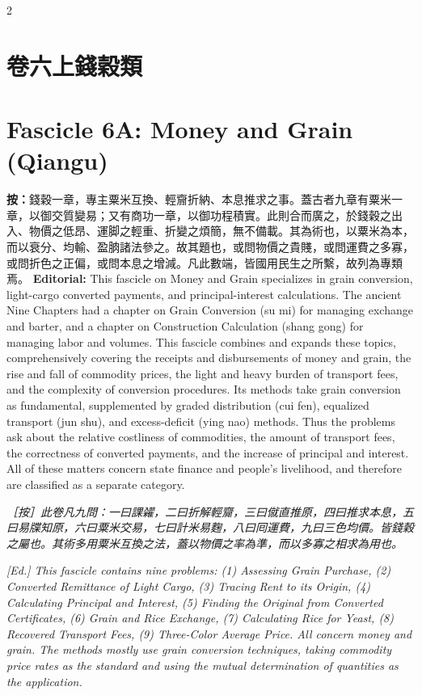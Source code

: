 \documentclass[11pt,a4paper]{article}
\newcommand{\EdNoteText}[1]{\par\noindent\textit{\color{ednotecolor}［按］#1}\par}
\newcommand{\EdNoteEn}[1]{\par\noindent\textit{\color{ednotecolor}[Ed.] #1}\par}
\begin{document}
\newpage
\begin{paracol}{2}

\section*{\color{titlecolor}卷六上\quad 錢穀類}
\switchcolumn
\section*{\color{titlecolor}Fascicle 6A: Money and Grain (Qiangu)}
\switchcolumn*

\noindent\textbf{按：}錢穀一章，專主粟米互換、輕齎折納、本息推求之事。蓋古者九章有粟米一章，以御交質變易；又有商功一章，以御功程積實。此則合而廣之，於錢穀之出入、物價之低昂、運脚之輕重、折變之煩簡，無不備載。其為術也，以粟米為本，而以衰分、均輸、盈朒諸法參之。故其題也，或問物價之貴賤，或問運費之多寡，或問折色之正偏，或問本息之增減。凡此數端，皆國用民生之所繫，故列為專類焉。
\switchcolumn
\noindent\textbf{Editorial:} This fascicle on Money and Grain specializes in grain conversion, light-cargo converted payments, and principal-interest calculations. The ancient Nine Chapters had a chapter on Grain Conversion (su mi) for managing exchange and barter, and a chapter on Construction Calculation (shang gong) for managing labor and volumes. This fascicle combines and expands these topics, comprehensively covering the receipts and disbursements of money and grain, the rise and fall of commodity prices, the light and heavy burden of transport fees, and the complexity of conversion procedures. Its methods take grain conversion as fundamental, supplemented by graded distribution (cui fen), equalized transport (jun shu), and excess-deficit (ying nao) methods. Thus the problems ask about the relative costliness of commodities, the amount of transport fees, the correctness of converted payments, and the increase of principal and interest. All of these matters concern state finance and people's livelihood, and therefore are classified as a separate category.
\switchcolumn*

\EdNoteText{此卷凡九問：一曰課糴，二曰折解輕齎，三曰僦直推原，四曰推求本息，五曰易牒知原，六曰粟米交易，七曰計米易麴，八曰囘運費，九曰三色均價。皆錢穀之屬也。其術多用粟米互換之法，蓋以物價之率為準，而以多寡之相求為用也。}
\switchcolumn
\EdNoteEn{This fascicle contains nine problems: (1) Assessing Grain Purchase, (2) Converted Remittance of Light Cargo, (3) Tracing Rent to its Origin, (4) Calculating Principal and Interest, (5) Finding the Original from Converted Certificates, (6) Grain and Rice Exchange, (7) Calculating Rice for Yeast, (8) Recovered Transport Fees, (9) Three-Color Average Price. All concern money and grain. The methods mostly use grain conversion techniques, taking commodity price rates as the standard and using the mutual determination of quantities as the application.}

\end{paracol}
\end{document}
